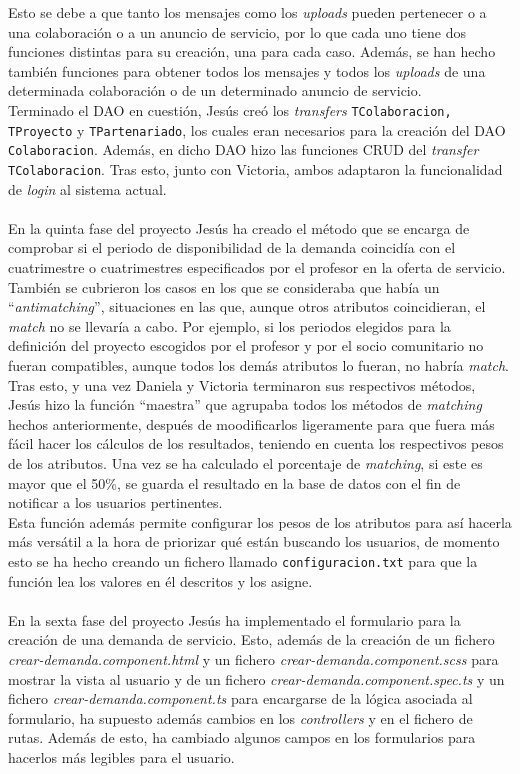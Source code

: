 \documentclass[11pt]{book}
\begin{document}
	Esto se debe a que tanto los mensajes como los \emph{uploads} pueden pertenecer o a una colaboración o a un anuncio de servicio, por lo que cada uno tiene dos funciones distintas para su creación, una para cada caso. Además, se han hecho también funciones para obtener todos los mensajes y todos los \emph{uploads} de una determinada colaboración o de un determinado anuncio de servicio.\\
	Terminado el DAO en cuestión, Jesús creó los \emph{transfers} \texttt{TColaboracion, TProyecto} y \texttt{TPartenariado}, los cuales eran necesarios para la creación del DAO \texttt{Colaboracion}. Además, en dicho DAO hizo las funciones CRUD del \emph{transfer} \texttt{TColaboracion}. Tras esto, junto con Victoria, ambos adaptaron la funcionalidad de \textit{login} al sistema actual.\\\\
	En la quinta fase del proyecto Jesús ha creado el método que se encarga de comprobar si el periodo de disponibilidad de la demanda coincidía con el cuatrimestre o cuatrimestres especificados por el profesor en la oferta de servicio. También se cubrieron los casos en los que se consideraba que había un ``\emph{antimatching}'', situaciones en las que, aunque otros atributos coincidieran, el \textit{match} no se llevaría a cabo. Por ejemplo, si los periodos elegidos para la definición del proyecto escogidos por el profesor y por el socio comunitario no fueran compatibles, aunque todos los demás atributos lo fueran, no habría \emph{match}.\\
	Tras esto, y una vez Daniela y Victoria terminaron sus respectivos métodos, Jesús hizo la función ``maestra'' que agrupaba todos los métodos de \emph{matching} hechos anteriormente, después de moodificarlos ligeramente para que fuera más fácil hacer los cálculos de los resultados, teniendo en cuenta los respectivos pesos de los atributos. Una vez se ha calculado el porcentaje de \emph{matching}, si este es mayor que el 50\%, se guarda el resultado en la base de datos con el fin de notificar a los usuarios pertinentes.\\
	Esta función además permite configurar los pesos de los atributos para así hacerla más versátil a la hora de priorizar qué están buscando los usuarios, de momento esto se ha hecho creando un fichero llamado \texttt{configuracion.txt} para que la función lea los valores en él descritos y los asigne.\\\\
	En la sexta fase del proyecto Jesús ha implementado el formulario para la creación de una demanda de servicio. Esto, además de la creación de un fichero \textit{crear-demanda.component.html} y un fichero \textit{crear-demanda.component.scss} para mostrar la vista al usuario  y de un fichero \textit{crear-demanda.component.spec.ts}
	y un fichero \textit{crear-demanda.component.ts} para encargarse de la lógica asociada al formulario, ha supuesto además cambios en los \emph{controllers} y en el fichero de rutas. Además de esto, ha cambiado algunos campos en los formularios para hacerlos más legibles para el usuario.



\end{document}

